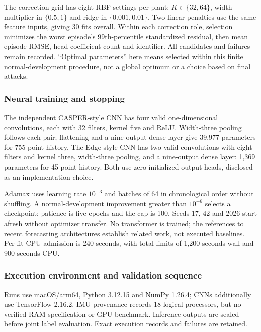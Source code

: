 The correction grid has eight RBF settings per plant: $K\in\{32,64\}$, width multiplier in $\{0.5,1\}$ and ridge in $\{0.001,0.01\}$. Two linear penalties use the same feature inputs, giving 30 fits overall. Within each correction role, selection minimizes the worst episode's 99th-percentile standardized residual, then mean episode RMSE, head coefficient count and identifier. All candidates and failures remain recorded. ``Optimal parameters'' here means selected within this finite normal-development procedure, not a global optimum or a choice based on final attacks.

\subsubsection{Neural training and stopping}
The independent CASPER-style CNN has four valid one-dimensional convolutions, each with 32 filters, kernel five and ReLU. Width-three pooling follows each pair; flattening and a nine-output dense layer give 39,977 parameters for 755-point history. The Edge-style CNN has two valid convolutions with eight filters and kernel three, width-three pooling, and a nine-output dense layer: 1,369 parameters for 45-point history. Both use zero-initialized output heads, disclosed as an implementation choice.

Adamax uses learning rate $10^{-3}$ and batches of 64 in chronological order without shuffling. A normal-development improvement greater than $10^{-6}$ selects a checkpoint; patience is five epochs and the cap is 100. Seeds 17, 42 and 2026 start afresh without optimizer transfer. No transformer is trained; the references to recent forecasting architectures establish related work, not executed baselines. Per-fit CPU admission is 240 seconds, with total limits of 1,200 seconds wall and 900 seconds CPU.

\subsubsection{Execution environment and validation sequence}
Runs use macOS/arm64, Python 3.12.15 and NumPy 1.26.4; CNNs additionally use TensorFlow 2.16.2. IMU provenance records 18 logical processors, but no verified RAM specification or GPU benchmark. Inference outputs are sealed before joint label evaluation. Exact execution records and failures are retained.

